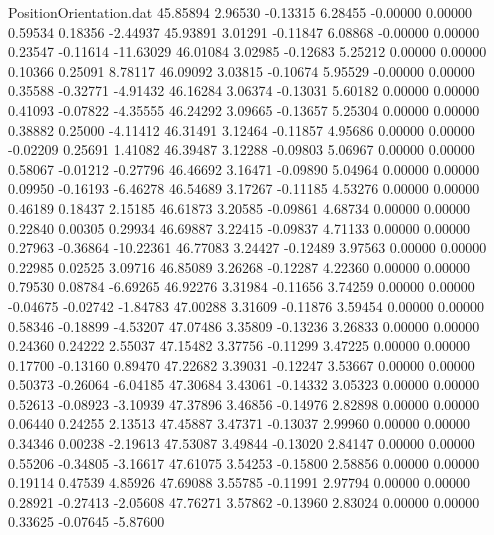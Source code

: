 \begin{filecontents}{PositionOrientation.dat}
  45.85894    2.96530   -0.13315     6.28455   -0.00000    0.00000    0.59534    0.18356   -2.44937
  45.93891    3.01291   -0.11847     6.08868   -0.00000    0.00000    0.23547   -0.11614  -11.63029
  46.01084    3.02985   -0.12683     5.25212    0.00000    0.00000    0.10366    0.25091    8.78117
  46.09092    3.03815   -0.10674     5.95529   -0.00000    0.00000    0.35588   -0.32771   -4.91432
  46.16284    3.06374   -0.13031     5.60182    0.00000    0.00000    0.41093   -0.07822   -4.35555
  46.24292    3.09665   -0.13657     5.25304    0.00000    0.00000    0.38882    0.25000   -4.11412
  46.31491    3.12464   -0.11857     4.95686    0.00000    0.00000   -0.02209    0.25691    1.41082
  46.39487    3.12288   -0.09803     5.06967    0.00000    0.00000    0.58067   -0.01212   -0.27796
  46.46692    3.16471   -0.09890     5.04964    0.00000    0.00000    0.09950   -0.16193   -6.46278
  46.54689    3.17267   -0.11185     4.53276    0.00000    0.00000    0.46189    0.18437    2.15185
  46.61873    3.20585   -0.09861     4.68734    0.00000    0.00000    0.22840    0.00305    0.29934
  46.69887    3.22415   -0.09837     4.71133    0.00000    0.00000    0.27963   -0.36864  -10.22361
  46.77083    3.24427   -0.12489     3.97563    0.00000    0.00000    0.22985    0.02525    3.09716
  46.85089    3.26268   -0.12287     4.22360    0.00000    0.00000    0.79530    0.08784   -6.69265
  46.92276    3.31984   -0.11656     3.74259    0.00000    0.00000   -0.04675   -0.02742   -1.84783
  47.00288    3.31609   -0.11876     3.59454    0.00000    0.00000    0.58346   -0.18899   -4.53207
  47.07486    3.35809   -0.13236     3.26833    0.00000    0.00000    0.24360    0.24222    2.55037
  47.15482    3.37756   -0.11299     3.47225    0.00000    0.00000    0.17700   -0.13160    0.89470
  47.22682    3.39031   -0.12247     3.53667    0.00000    0.00000    0.50373   -0.26064   -6.04185
  47.30684    3.43061   -0.14332     3.05323    0.00000    0.00000    0.52613   -0.08923   -3.10939
  47.37896    3.46856   -0.14976     2.82898    0.00000    0.00000    0.06440    0.24255    2.13513
  47.45887    3.47371   -0.13037     2.99960    0.00000    0.00000    0.34346    0.00238   -2.19613
  47.53087    3.49844   -0.13020     2.84147    0.00000    0.00000    0.55206   -0.34805   -3.16617
  47.61075    3.54253   -0.15800     2.58856    0.00000    0.00000    0.19114    0.47539    4.85926
  47.69088    3.55785   -0.11991     2.97794    0.00000    0.00000    0.28921   -0.27413   -2.05608
  47.76271    3.57862   -0.13960     2.83024    0.00000    0.00000    0.33625   -0.07645   -5.87600

\end{filecontents}
